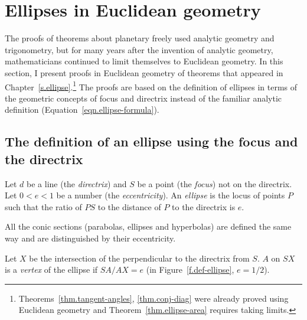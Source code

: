 
\chapter{Ellipses in Euclidean geometry}\label{s.geometry}

The proofs of theorems about planetary freely used analytic geometry and trigonometry, but for many years after the invention of analytic geometry, mathematicians continued to limit themselves to Euclidean geometry. In this section, I present proofs in Euclidean geometry of theorems that appeared in Chapter~\ref{s.ellipse}.\footnote{Theorems~\ref{thm.tangent-angles}, \ref{thm.conj-diag} were already proved using Euclidean geometry and Theorem~\ref{thm.ellipse-area} requires taking limits.} The proofs are based on the definition of ellipses in terms of the geometric concepts of focus and directrix instead of the familiar analytic definition (Equation~\ref{eqn.ellipse-formula}).


\section{The definition of an ellipse using the focus and the directrix}

\begin{definition}\label{def.ellipse}
Let $d$ be a line (the \emph{directrix}) and $S$ be a point (the \emph{focus}) not on the directrix. Let $0<e<1$ be a number (the \emph{eccentricity}). An \emph{ellipse} is the locus of points $P$ such that the ratio of  $PS$ to the distance of $P$ to the directrix is $e$.
\end{definition}

All the conic sections (parabolas, ellipses and hyperbolas) are defined the same way and are distinguished by their eccentricity.
\begin{definition}
Let $X$ be the intersection of the perpendicular to the directrix from $S$. $A$ on $SX$ is a \emph{vertex} of the ellipse if $SA/AX=e$ (in Figure~\ref{f.def-ellipse}, $e=1/2$).
\end{definition}


